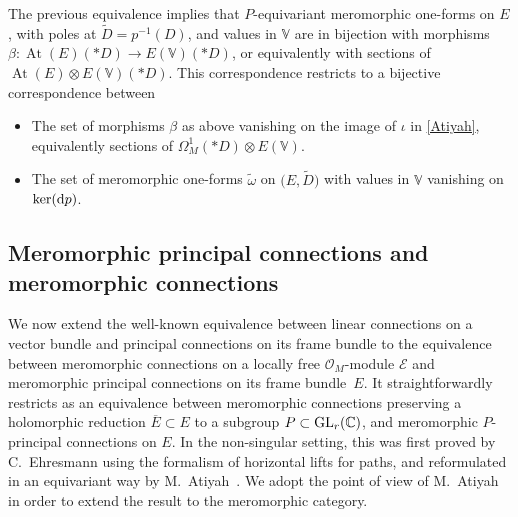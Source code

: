 \documentclass[pdftex]{sigma}
\numberwithin{equation}{section}
\begin{document}
The previous equivalence implies that $P$-equivariant meromorphic one-forms on $E$, with poles at $\tilde{D}=p^{-1}(D)$, and values in $\mathbb{V}$ are in bijection with morphisms $\beta\colon \operatorname{At}(E)(* D) \longrightarrow E(\mathbb{V})(* D)$, or equivalently with sections of $\operatorname{At}(E) \otimes E(\mathbb{V})(* D)$. This correspondence restricts to a bijective correspondence between
 \begin{itemize}\itemsep=0pt
 \item[$\bullet$] The set of morphisms $\beta$ as above vanishing on the image of $\iota$ in \eqref{Atiyah}, equivalently sections of $\Omega^1_M(* D) \otimes E(\mathbb{V})$.
 \item[$\bullet$] The set of meromorphic one-forms $\tilde{\omega}$ on $\big(E,\tilde{D}\big)$ with values in $\mathbb{V}$ vanishing on $\ker({\rm d}p)$. \end{itemize}

\subsection{Meromorphic principal connections and meromorphic connections}\label{sectionprincipale}

We now extend the well-known equivalence between linear connections on a vector bundle and principal connections on its frame bundle to the equivalence between meromorphic connections on a locally free $\mathcal{O}_M$-module $\mathcal{E}$ and meromorphic principal connections on its frame bundle~$E$. It straightforwardly restricts as an equivalence between meromorphic connections preserving a holomorphic reduction $\overline{E}\subset E$ to a subgroup $P\subset {\rm GL}_r(\mathbb{C})$, and meromorphic $P$-principal connections on $E$. In the non-singular setting, this was first proved by C.~Ehresmann \cite{Erhesmanh} using the formalism of horizontal lifts for paths, and reformulated in an equivariant way by M.~Atiyah~\cite{Atiyah}. We adopt the point of view of M.~Atiyah in order to extend the result to the meromorphic category.
\end{document}
